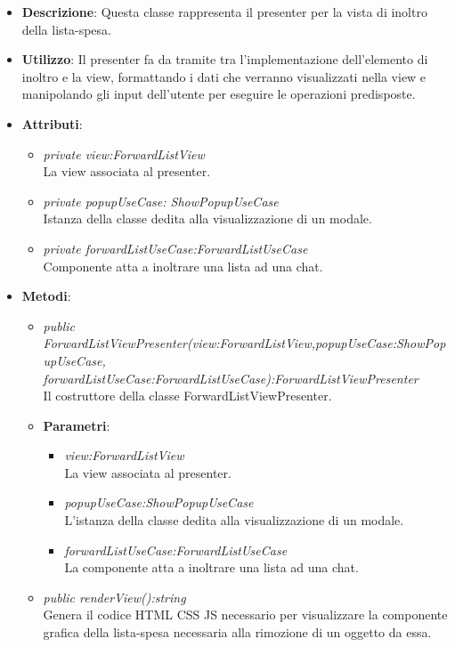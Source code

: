 \begin{itemize}
\item \textbf{Descrizione}: Questa classe rappresenta il presenter per la vista di inoltro della lista-spesa.
\item \textbf{Utilizzo}: Il presenter fa da tramite tra l'implementazione dell'elemento di inoltro e la view, formattando i dati che verranno visualizzati nella view e manipolando gli input dell'utente per eseguire le operazioni predisposte.
\item \textbf{Attributi}: 
	\begin{itemize}
	\item \textit{private view:ForwardListView}\\
	La view associata al presenter.
	\item \textit{private popupUseCase: ShowPopupUseCase} \\
	Istanza della classe dedita alla visualizzazione di un modale.
	\item \textit {private forwardListUseCase:ForwardListUseCase}\\
	Componente atta a inoltrare una lista ad una chat.
	\end{itemize}
\item \textbf{Metodi}:
	\begin{itemize}	
	\item \textit{public ForwardListViewPresenter(view:ForwardListView,popupUseCase:ShowPopupUseCase, \\ forwardListUseCase:ForwardListUseCase):ForwardListViewPresenter}\\
	Il costruttore della classe ForwardListViewPresenter.
	\item{\textbf{Parametri}: \begin{itemize}
			\item \textit{view:ForwardListView}\\
			La view associata al presenter.
			\item \textit{popupUseCase:ShowPopupUseCase}\\
			L'istanza della classe dedita alla visualizzazione di un modale.			
			\item \textit{forwardListUseCase:ForwardListUseCase}\\
			La componente atta a inoltrare una lista ad una chat.
			\end{itemize}}
	\item \textit{public renderView():string}\\
		Genera il codice HTML CSS JS necessario per visualizzare la componente grafica della lista-spesa necessaria alla rimozione di un oggetto da essa.

\end{itemize}
\end{itemize}
